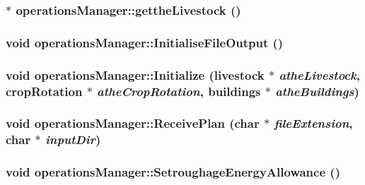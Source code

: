 \label{classoperations_manager_a4686ccc4794cd478cdac45773c2432ef}
\hypertarget{classoperations_manager_a43799d6fb845ba2a7936b7640eb81b55}{
\subsubsection[{gettheLivestock}]{$\ast$ operationsManager::gettheLivestock ()}}
\label{classoperations_manager_a43799d6fb845ba2a7936b7640eb81b55}
\hypertarget{classoperations_manager_aa2f597f6e05fbf5f2e5d113d6ad32e6d}{
\subsubsection[{InitialiseFileOutput}]{\setlength{\rightskip}{0pt plus 5cm}void operationsManager::InitialiseFileOutput ()}}
\label{classoperations_manager_aa2f597f6e05fbf5f2e5d113d6ad32e6d}
\hypertarget{classoperations_manager_a626da45cf40c334217d05a5e170c5e80}{
\subsubsection[{Initialize}]{\setlength{\rightskip}{0pt plus 5cm}void operationsManager::Initialize ({\bf livestock} $\ast$ {\em atheLivestock}, \/  {\bf cropRotation} $\ast$ {\em atheCropRotation}, \/  {\bf buildings} $\ast$ {\em atheBuildings})}}
\label{classoperations_manager_a626da45cf40c334217d05a5e170c5e80}
\hypertarget{classoperations_manager_ae0ed0a06687b22465717078dc79a087d}{
\subsubsection[{ReceivePlan}]{\setlength{\rightskip}{0pt plus 5cm}void operationsManager::ReceivePlan (char $\ast$ {\em fileExtension}, \/  char $\ast$ {\em inputDir})}}
\label{classoperations_manager_ae0ed0a06687b22465717078dc79a087d}
\hypertarget{classoperations_manager_a324640de5c140025dbc909addb55d367}{
\subsubsection[{SetroughageEnergyAllowance}]{\setlength{\rightskip}{0pt plus 5cm}void operationsManager::SetroughageEnergyAllowance ()}}
